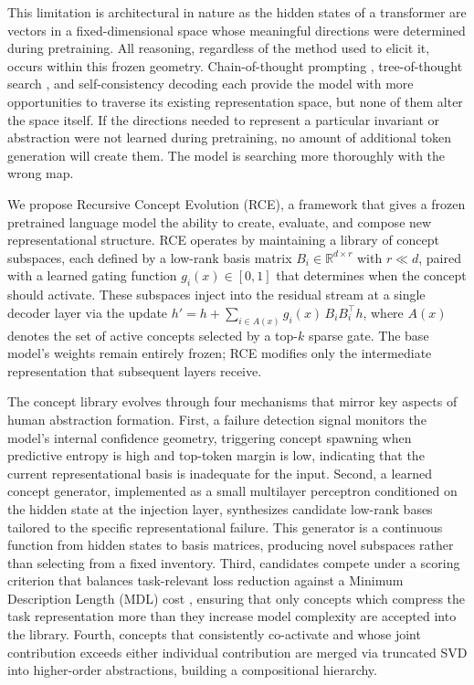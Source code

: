 \documentclass[11pt]{article}
\begin{document}
This limitation is architectural in nature as the hidden states of a transformer are vectors in a fixed-dimensional space whose meaningful directions were determined during pretraining. All reasoning, regardless of the method used to elicit it, occurs within this frozen geometry. Chain-of-thought prompting \cite{wei2022cot}, tree-of-thought search \cite{yao2023tot}, and self-consistency decoding \cite{wang2023selfconsistency} each provide the model with more opportunities to traverse its existing representation space, but none of them alter the space itself. If the directions needed to represent a particular invariant or abstraction were not learned during pretraining, no amount of additional token generation will create them. The model is searching more thoroughly with the wrong map.

We propose Recursive Concept Evolution (RCE), a framework that gives a frozen pretrained language model the ability to create, evaluate, and compose new representational structure. RCE operates by maintaining a library of concept subspaces, each defined by a low-rank basis matrix $B_i \in \mathbb{R}^{d \times r}$ with $r \ll d$, paired with a learned gating function $g_i(x) \in [0,1]$ that determines when the concept should activate. These subspaces inject into the residual stream at a single decoder layer via the update $h' = h + \sum_{i \in A(x)} g_i(x)\, B_i B_i^\top h$, where $A(x)$ denotes the set of active concepts selected by a top-$k$ sparse gate. The base model's weights remain entirely frozen; RCE modifies only the intermediate representation that subsequent layers receive.

The concept library evolves through four mechanisms that mirror key aspects of human abstraction formation. First, a failure detection signal monitors the model's internal confidence geometry, triggering concept spawning when predictive entropy is high and top-token margin is low, indicating that the current representational basis is inadequate for the input. Second, a learned concept generator, implemented as a small multilayer perceptron conditioned on the hidden state at the injection layer, synthesizes candidate low-rank bases tailored to the specific representational failure. This generator is a continuous function from hidden states to basis matrices, producing novel subspaces rather than selecting from a fixed inventory. Third, candidates compete under a scoring criterion that balances task-relevant loss reduction against a Minimum Description Length (MDL) cost \cite{rissanen1978mdl}, ensuring that only concepts which compress the task representation more than they increase model complexity are accepted into the library. Fourth, concepts that consistently co-activate and whose joint contribution exceeds either individual contribution are merged via truncated SVD into higher-order abstractions, building a compositional hierarchy.
\end{document}
